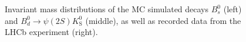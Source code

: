 \begin{figure}[tb]
\begin{subfigure}{.32\textwidth}
  \end{subfigure}
  \caption{Invariant mass distributions of the MC simulated decays $B^0_s$ (left) and $B^0_d \to \psi(2S) K^0_\mathrm{S}$ (middle), as well as recorded data from the LHCb experiment (right).}
  \label{fig:dists}
\end{figure}
